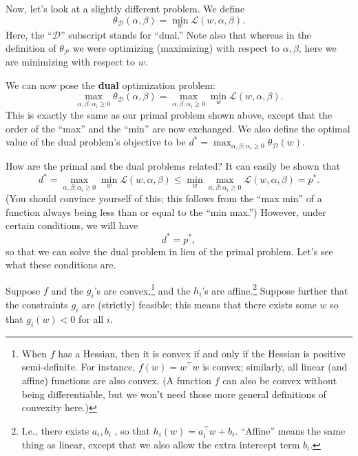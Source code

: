 Now, let's look at a slightly different problem. We define
\begin{equation*}
    \theta_{\mathcal D} (\alpha,\beta) = \min_w \mathcal L(w,\alpha,\beta).
\end{equation*}
Here, the ``$\mathcal D$'' subscript stands for ``dual.'' Note also that whereas in the
definition of $\theta_{\mathcal P}$ we were optimizing (maximizing) with respect to $\alpha,\beta$, here
we are minimizing with respect to $w$.

We can now pose the \textbf{dual} optimization problem:
\begin{equation*}
    \max_{\alpha,\beta :\alpha_i \ge 0} \theta_{\mathcal D} (\alpha,\beta) = \max_{\alpha,\beta :\alpha_i \ge 0} \min_w \mathcal L(w,\alpha,\beta).
\end{equation*}
This is exactly the same as our primal problem shown above, except that the
order of the ``max'' and the ``min'' are now exchanged. We also define the
optimal value of the dual problem's objective to be $d^* = \max_{\alpha,\beta :\alpha_i \ge 0} \theta_{\mathcal D} (w)$.

How are the primal and the dual problems related? It can easily be shown
that
\begin{equation*}
    d^* = \max_{\alpha,\beta :\alpha_i \ge 0} \min_w \mathcal L(w,\alpha,\beta) \le \min_w \max_{\alpha,\beta :\alpha_i \ge 0} \mathcal L(w,\alpha,\beta) = p^*.    
\end{equation*}
(You should convince yourself of this; this follows from the ``max min'' of a
function always being less than or equal to the ``min max.'') However, under
certain conditions, we will have
\begin{equation*}
    d^* = p^*,
\end{equation*}
so that we can solve the dual problem in lieu of the primal problem. Let's
see what these conditions are.

Suppose $f$ and the $g_i$'s are convex,\footnote{
When $f$ has a Hessian, then it is convex if and only if the Hessian is positive semi-definite.
For instance, $f(w) = w^\top w$ is convex; similarly, all linear (and affine) functions
are also convex. (A function $f$ can also be convex without being differentiable, but we
won't need those more general definitions of convexity here.)} and the $h_i$'s are affine.\footnote{
I.e., there exists $a_i , b_i$ , so that $h_i (w) = a^\top_i w + b_i$. ``Affine'' means the same thing as
linear, except that we also allow the extra intercept term $b_i$.} Suppose
further that the constraints $g_i$ are (strictly) feasible; this means that there
exists some $w$ so that $g_i (w) < 0$ for all $i$.

